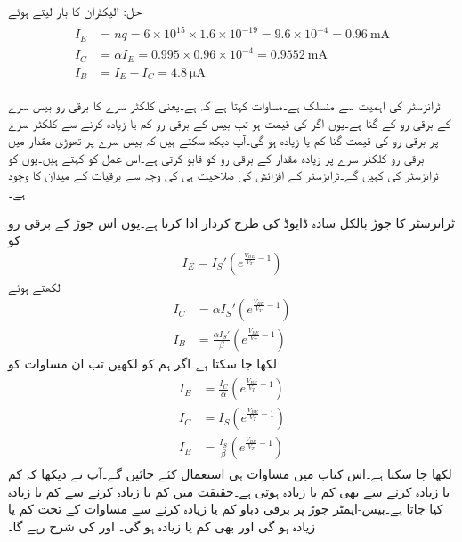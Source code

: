 حل:
	الیکٹران کا بار  لیتے ہوئے
\begin{gather}
\begin{aligned}
I_E&=nq=6 \times 10^{15} \times 1.6 \times 10^{-19}=9.6 \times 10^{-4}=\SI{0.96}{\milli \ampere}\\
I_C&=\alpha I_E = 0.995 \times 0.96 \times 10^{-4}=\SI{0.9552}{\milli \ampere}\\
I_B&=I_E-I_C=\SI{4.8}{\micro \ampere}
\end{aligned}
\end{gather}

ٹرانزسٹر کی اہمیت  سے منسلک ہے۔مساوات   کہتا ہے کہ   ہے۔یعنی کلکٹر  سرے کا برقی رو بیس سرے کے برقی رو کے  گنا ہے۔یوں اگر  کی قیمت  ہو تب بیس کے برقی رو کم یا زیادہ کرنے سے کلکٹر  سرے پر برقی رو کی قیمت  گنا کم یا زیادہ ہو گی۔آپ دیکھ سکتے ہیں کہ بیس سرے پر تھوڑی مقدار میں برقی رو کلکٹر  سرے پر زیادہ مقدار کے برقی رو کو قابو کرتی ہے۔اس عمل کو   کہتے ہیں۔یوں  کو ٹرانزسٹر کی   کہیں گے۔ٹرانزسٹر کے افزائش کی صلاحیت ہی کی وجہ سے برقیات کے میدان کا وجود ہے۔

ٹرانزسٹر کا  جوڑ بالکل سادہ ڈایوڈ کی طرح کردار ادا کرتا ہے۔یوں اس جوڑ کے برقی رو کو
\begin{align*}
I_E=I_S' \left(e^{\frac{V_{BE}}{V_T}-1} \right)
\end{align*}
لکھتے ہوئے 
\begin{align*}
I_C&=\alpha  I_S' \left(e^{\frac{V_{BE}}{V_T}-1} \right)\\
I_B&=\frac{\alpha I_S'}{\beta} \left(e^{\frac{V_{BE}}{V_T}-1} \right)
\end{align*}
لکھا جا سکتا ہے۔اگر ہم   کو  لکھیں تب ان مساوات کو
\begin{gather}
\begin{aligned}\label{مساوات_ٹرانزسٹر_بنیادی_ڈایوڈ-مساوات}
I_E&=\frac{I_C}{\alpha} \left(e^{\frac{V_{BE}}{V_T}-1} \right)\\
I_C &= I_S \left(e^{\frac{V_{BE}}{V_T}-1} \right)\\
I_B&=\frac{I_S}{\beta} \left(e^{\frac{V_{BE}}{V_T}-1} \right)
\end{aligned}
\end{gather}
لکھا جا سکتا ہے۔اس کتاب میں مساوات  ہی استعمال کئے جائیں گے۔آپ نے دیکھا کہ  کم یا زیادہ کرنے سے  بھی کم یا زیادہ ہوتی ہے۔حقیقت میں  کم یا زیادہ کرنے سے  کم یا زیادہ کیا جاتا ہے۔بیس-ایمٹر جوڑ پر برقی دباو  کم یا زیادہ کرنے سے   مساوات  کے تحت کم یا زیادہ  ہو گی اور  بھی کم یا زیادہ ہو گی۔ اور  کی شرح  رہے گا۔

